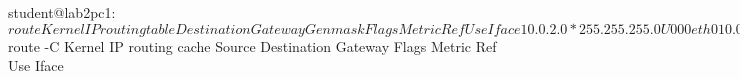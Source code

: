 student@lab2pc1:~$ route
Kernel IP routing table
Destination     Gateway         Genmask         Flags Metric Ref    Use Iface
10.0.2.0        *               255.255.255.0   U     0      0        0 eth0
10.0.3.0        10.0.2.1        255.255.255.0   UG    0      0        0 eth0

student@lab2pc1:~$ route -C
Kernel IP routing cache
Source          Destination     Gateway         Flags Metric Ref    Use Iface
